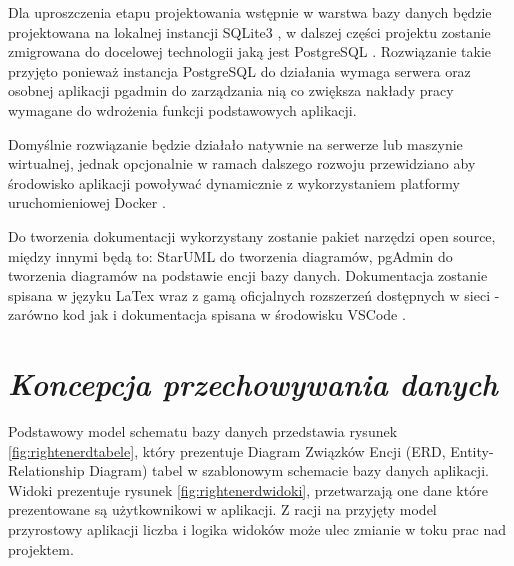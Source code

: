 \documentclass[a4paper, 10pt, twoside, openright]{report}
\newcommand{\customstylesection}[1]{\textbf{\textit{#1}}}
\begin{document}
\begin{large}
{Dla uproszczenia etapu projektowania wstępnie w warstwa bazy danych będzie 
projektowana na lokalnej instancji SQLite3 \cite{SQLite}, w dalszej części 
projektu zostanie zmigrowana do docelowej technologii jaką jest PostgreSQL 
\cite{PostgreSQL}. Rozwiązanie takie przyjęto ponieważ instancja PostgreSQL do 
działania wymaga serwera oraz osobnej aplikacji pgadmin \cite{pgAdmin} do 
zarządzania nią co zwiększa nakłady pracy wymagane do wdrożenia funkcji 
podstawowych aplikacji.}

{Domyślnie rozwiązanie będzie działało natywnie na serwerze lub maszynie 
wirtualnej, jednak opcjonalnie w ramach dalszego rozwoju przewidziano aby 
środowisko aplikacji powoływać dynamicznie z wykorzystaniem platformy 
uruchomieniowej Docker \cite{Docker}.}

{Do tworzenia dokumentacji wykorzystany zostanie pakiet narzędzi open source, 
między innymi będą to: StarUML \cite{StarUML} do tworzenia diagramów, pgAdmin 
\cite{pgAdmin} do tworzenia diagramów na podstawie encji bazy danych. 
Dokumentacja zostanie spisana w języku LaTex \cite{LaTeX} wraz z gamą 
oficjalnych rozszerzeń dostępnych w sieci - zarówno kod jak i dokumentacja 
spisana w środowisku VSCode \cite{VSCode}.}

\section{\customstylesection{Koncepcja przechowywania danych}}
{Podstawowy model schematu bazy danych przedstawia rysunek 
\ref{fig:rightenerdtabele}, który prezentuje Diagram Związków Encji (ERD, 
Entity-Relationship Diagram) tabel w szablonowym schemacie bazy danych 
aplikacji. Widoki prezentuje rysunek \ref{fig:rightenerdwidoki}, przetwarzają 
one dane które prezentowane są użytkownikowi w aplikacji. Z racji na przyjęty 
model przyrostowy aplikacji liczba i logika widoków może ulec zmianie w toku 
prac nad projektem.}


\end{large}
\end{document}

